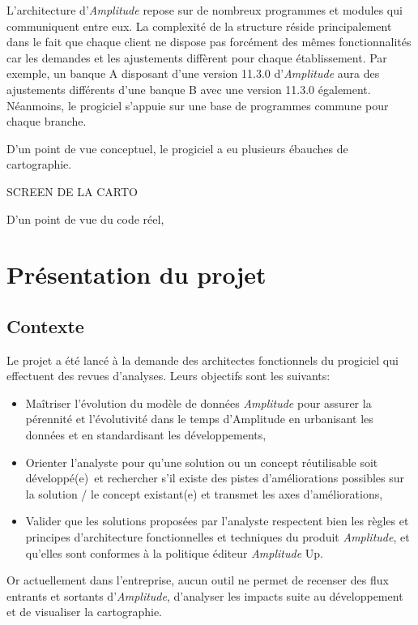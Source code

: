 \documentclass{polytech/polytech}
\begin{document}
L'architecture d'\textit{Amplitude} repose sur de nombreux programmes et modules qui communiquent entre eux. La complexité de la structure réside principalement dans le fait que chaque client ne dispose pas forcément des mêmes fonctionnalités car les demandes et les ajustements diffèrent pour chaque établissement. Par exemple, un banque A disposant d'une version 11.3.0 d'\textit{Amplitude} aura des ajustements différents d'une banque B avec une version 11.3.0 également. Néanmoins, le progiciel s'appuie sur une base de programmes commune pour chaque branche. 


D'un point de vue conceptuel, le progiciel a eu plusieurs ébauches de cartographie.


SCREEN DE LA CARTO


D'un point de vue du code réel,

\chapter{Présentation du projet}


\section{Contexte}

Le projet a été lancé à la demande des architectes fonctionnels du progiciel qui effectuent des revues d'analyses. Leurs objectifs sont les suivants:

\begin{itemize}
	\item Maîtriser l’évolution du modèle de données \textit{Amplitude} pour assurer la pérennité et l’évolutivité dans le temps d’Amplitude en urbanisant les données et en standardisant les développements,
	\item Orienter l’analyste pour qu’une solution ou un concept réutilisable soit développé(e) et rechercher s’il existe des pistes d’améliorations possibles sur la solution / le concept existant(e) et transmet les axes d’améliorations,
	\item Valider que les solutions proposées par l’analyste respectent bien les règles et principes d’architecture fonctionnelles et techniques du produit \textit{Amplitude}, et qu’elles sont conformes à la politique éditeur \textit{Amplitude} Up.
\end{itemize}

Or actuellement dans l'entreprise, aucun outil ne permet de recenser des flux entrants et sortants d'\textit{Amplitude}, d'analyser les impacts suite au développement et de visualiser la cartographie.
\end{document}
